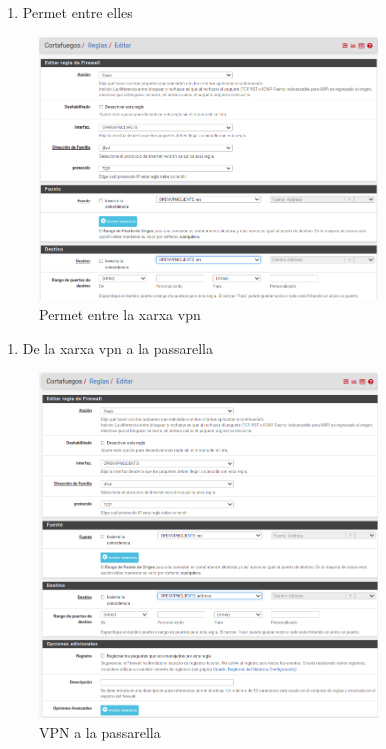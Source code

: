 \documentclass[
  10pt,
]{krantz}
\providecommand{\tightlist}{%
  \setlength{\itemsep}{0pt}\setlength{\parskip}{0pt}}
\begin{document}
\begin{enumerate}
\def\labelenumi{\arabic{enumi}.}
\setcounter{enumi}{2}
\tightlist
\item
  Permet entre elles
\end{enumerate}

\begin{figure}
\centering
\includegraphics[width=0.8\textwidth,height=\textheight]{imatges/proxmox/regla_vpn_vpn.png}
\caption{Permet entre la xarxa vpn}
\end{figure}

\begin{enumerate}
\def\labelenumi{\arabic{enumi}.}
\setcounter{enumi}{3}
\tightlist
\item
  De la xarxa vpn a la passarella
\end{enumerate}

\begin{figure}
\centering
\includegraphics[width=0.8\textwidth,height=\textheight]{imatges/proxmox/regla_vpn_passarella.png}
\caption{VPN a la passarella}
\end{figure}
\end{document}
